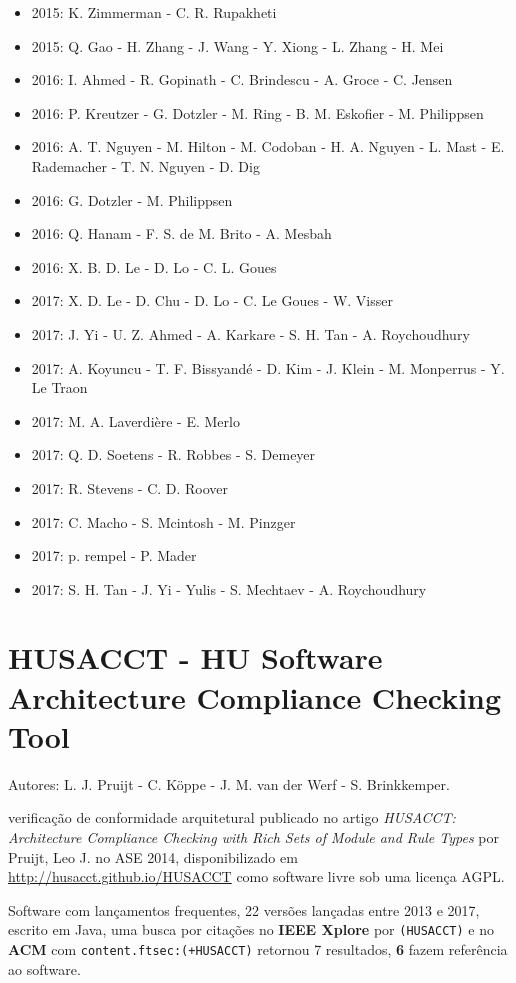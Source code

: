 \begin{itemize}
\item 2015: K. Zimmerman - C. R. Rupakheti
\item 2015: Q. Gao - H. Zhang - J. Wang - Y. Xiong - L. Zhang - H. Mei
\item 2016: I. Ahmed - R. Gopinath - C. Brindescu - A. Groce - C. Jensen
\item 2016: P. Kreutzer - G. Dotzler - M. Ring - B. M. Eskofier - M. Philippsen
\item 2016: A. T. Nguyen - M. Hilton - M. Codoban - H. A. Nguyen - L. Mast - E. Rademacher - T. N. Nguyen - D. Dig
\item 2016: G. Dotzler - M. Philippsen
\item 2016: Q. Hanam - F. S. de M. Brito - A. Mesbah
\item 2016: X. B. D. Le - D. Lo - C. L. Goues
\item 2017: X. D. Le - D. Chu - D. Lo - C. Le Goues - W. Visser
\item 2017: J. Yi - U. Z. Ahmed - A. Karkare - S. H. Tan - A. Roychoudhury
\item 2017: A. Koyuncu - T. F. Bissyand{\'e} - D. Kim - J. Klein - M. Monperrus - Y. Le Traon
\item 2017: M. A. Laverdière - E. Merlo
\item 2017: Q. D. Soetens - R. Robbes - S. Demeyer
\item 2017: R. Stevens - C. D. Roover
\item 2017: C. Macho - S. Mcintosh - M. Pinzger
\item 2017: p. rempel - P. Mader
\item 2017: S. H. Tan - J. Yi - Yulis - S. Mechtaev - A. Roychoudhury
\end{itemize}

\section{HUSACCT - HU Software Architecture Compliance Checking Tool}

Autores:
L. J. Pruijt - C. K\"{o}ppe - J. M. van der Werf - S. Brinkkemper.

verificação de conformidade arquitetural
publicado no artigo {\it HUSACCT: Architecture Compliance Checking with Rich Sets of Module and Rule Types}
por Pruijt, Leo J.
no ASE 2014,
disponibilizado em \url{http://husacct.github.io/HUSACCT}
como software livre
sob uma licença AGPL.

Software com lançamentos frequentes,
22 versões lançadas
entre 2013 e 2017,
escrito em Java,
uma busca por citações no {\bf IEEE Xplore} por
\texttt{(HUSACCT)}
e no {\bf ACM} com
\texttt{content.ftsec:(+HUSACCT)}
retornou
7 resultados,
{\bf 6} fazem referência ao software.

